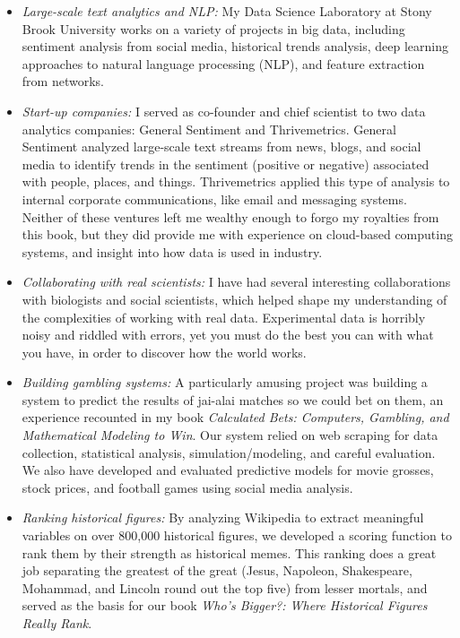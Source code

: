 \documentclass[10pt]{article}
\begin{document}
\begin{itemize}
  \item \emph{Large-scale text analytics and NLP:} My Data Science Laboratory at Stony Brook University works on a variety of projects in big data, including sentiment analysis from social media, historical trends analysis, deep learning approaches to natural language processing (NLP), and feature extraction from networks.
  \item \emph{Start-up companies:} I served as co-founder and chief scientist to two data analytics companies: General Sentiment and Thrivemetrics. General Sentiment analyzed large-scale text streams from news, blogs, and social media to identify trends in the sentiment (positive or negative) associated with people, places, and things. Thrivemetrics applied this type of analysis to internal corporate communications, like email and messaging systems.\\
Neither of these ventures left me wealthy enough to forgo my royalties from this book, but they did provide me with experience on cloud-based computing systems, and insight into how data is used in industry.
  \item \emph{Collaborating with real scientists:} I have had several interesting collaborations with biologists and social scientists, which helped shape my understanding of the complexities of working with real data. Experimental data is horribly noisy and riddled with errors, yet you must do the best you can with what you have, in order to discover how the world works.
  \item \emph{Building gambling systems:} A particularly amusing project was building a system to predict the results of jai-alai matches so we could bet on them, an experience recounted in my book \emph{Calculated Bets: Computers, Gambling, and Mathematical Modeling to Win}. Our system relied on web scraping for data collection, statistical analysis, simulation/modeling, and careful evaluation. We also have developed and evaluated predictive models for movie grosses, stock prices, and football games using social media analysis.
  \item \emph{Ranking historical figures:} By analyzing Wikipedia to extract meaningful variables on over 800,000 historical figures, we developed a scoring function to rank them by their strength as historical memes. This ranking does a great job separating the greatest of the great (Jesus, Napoleon, Shakespeare, Mohammad, and Lincoln round out the top five) from lesser mortals, and served as the basis for our book \emph{Who's Bigger?: Where Historical Figures Really Rank}.
\end{itemize}
\end{document}
